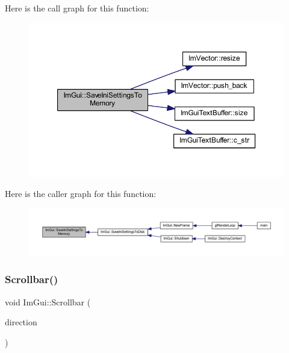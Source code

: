 Here is the call graph for this function\+:
\nopagebreak
\begin{figure}[H]
\begin{center}
\leavevmode
\includegraphics[width=350pt]{namespace_im_gui_a27043a530e0e842e01c279dd4207f9eb_cgraph}
\end{center}
\end{figure}
Here is the caller graph for this function\+:
\nopagebreak
\begin{figure}[H]
\begin{center}
\leavevmode
\includegraphics[width=350pt]{namespace_im_gui_a27043a530e0e842e01c279dd4207f9eb_icgraph}
\end{center}
\end{figure}
\mbox{\label{namespace_im_gui_abf1d7a83c5f0a555bbe7f831b0319c8a}} 
\subsubsection{\texorpdfstring{Scrollbar()}{Scrollbar()}}
{\footnotesize\ttfamily void Im\+Gui\+::\+Scrollbar (\begin{DoxyParamCaption}\item[{\mbox{\hyperlink{imgui__internal_8h_a86d7bb2ee8297d38b131d8ea7e6430c6}{Im\+Gui\+Layout\+Type}}}]{direction }\end{DoxyParamCaption})}

